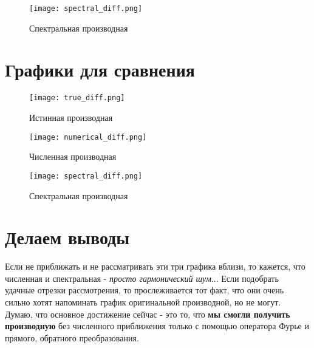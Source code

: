 \begin{figure}[ht]
    \centering
    \texttt{[image: spectral\_diff.png]}
	\caption{Спектральная производная}
\end{figure}

\newpage
\section{Графики для сравнения}

\begin{figure}[ht]
    \centering
    \texttt{[image: true\_diff.png]}
	\caption{Истинная производная}
\end{figure}

\begin{figure}[ht]
    \centering
    \texttt{[image: numerical\_diff.png]}
	\caption{Численная производная}
\end{figure}

\begin{figure}[ht]
    \centering
    \texttt{[image: spectral\_diff.png]}
	\caption{Спектральная производная}
\end{figure}

\newpage
\section{Делаем выводы}

Если не приближать и не рассматривать эти три графика вблизи, то кажется, что численная и спектральная - \textit{просто гармонический шум}... Если подобрать удачные отрезки рассмотрения, то прослеживается тот факт, что они очень сильно хотят напоминать график оригинальной производной, но не могут.
Думаю, что основное достижение сейчас - это то, что \textbf{мы смогли получить производную} без численного приближения только с помощью оператора Фурье и прямого, обратного преобразования.

\endinput